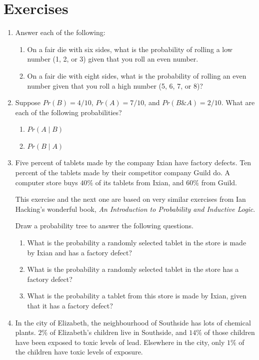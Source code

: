 \documentclass[justified]{tufte-book}
\providecommand{\tightlist}{%
  \setlength{\itemsep}{0pt}\setlength{\parskip}{0pt}}
\newcommand{\given}{\mid}
\renewcommand{\wedge}{\mathbin{\&}}
\newcommand{\p}{Pr}
\theoremstyle{definition}
\theoremstyle{definition}
\theoremstyle{definition}
\theoremstyle{definition}
\theoremstyle{remark}
\begin{document}
\hypertarget{ch6ex}{%
\section*{Exercises}\label{ch6ex}}

\begin{enumerate}
\item
  Answer each of the following:

  \begin{enumerate}
  \def\labelenumii{\alph{enumii}.}
  \tightlist
  \item
    On a fair die with six sides, what is the probability of rolling a low number (1, 2, or 3) given that you roll an even number.
  \item
    On a fair die with eight sides, what is the probability of rolling an even number given that you roll a high number (5, 6, 7, or 8)?
  \end{enumerate}
\item
  Suppose \(\p(B) = 4/10\), \(\p(A) = 7/10\), and \(\p(B \wedge A) = 2/10\).
  What are each of the following probabilities?

  \begin{enumerate}
  \def\labelenumii{\alph{enumii}.}
  \tightlist
  \item
    \(\p(A \given B)\)
  \item
    \(\p(B \given A)\)
  \end{enumerate}
\item
  Five percent of tablets made by the company Ixian have factory defects. Ten percent of the tablets made by their competitor company Guild do. A computer store buys \(40\%\) of its tablets from Ixian, and \(60\%\) from Guild.

  \begin{marginfigure}
   This exercise and the next one are based on very similar exercises from
   Ian Hacking's wonderful book, \emph{An Introduction to Probability and
   Inductive Logic}.
   \end{marginfigure}

  Draw a probability tree to answer the following questions.

  \begin{enumerate}
  \def\labelenumii{\alph{enumii}.}
  \tightlist
  \item
    What is the probability a randomly selected tablet in the store is made by Ixian and has a factory defect?
  \item
    What is the probability a randomly selected tablet in the store has a factory defect?
  \item
    What is the probability a tablet from this store is made by Ixian, given that it has a factory defect?
  \end{enumerate}
\item
  In the city of Elizabeth, the neighbourhood of Southside has lots of chemical plants. \(2\%\) of Elizabeth's children live in Southside, and \(14\%\) of those children have been exposed to toxic levels of lead. Elsewhere in the city, only \(1\%\) of the children have toxic levels of exposure.


\end{enumerate}
\end{document}
